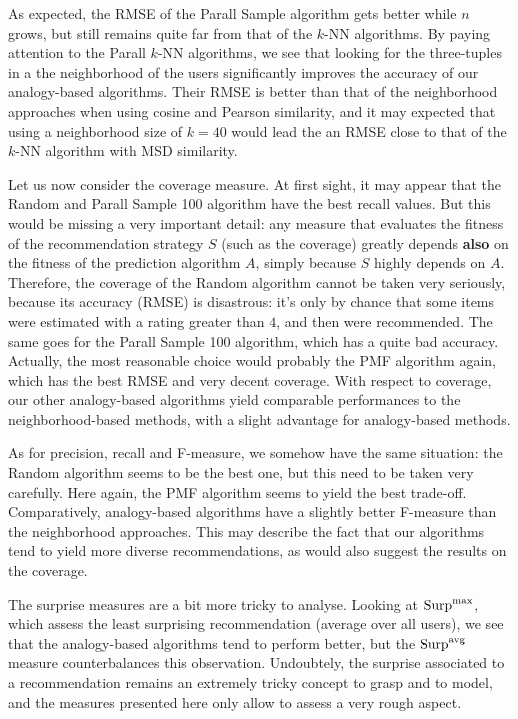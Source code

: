 As expected, the RMSE of the
Parall Sample algorithm gets better while $n$ grows, but still
remains quite far from that of the $k$-NN algorithms. By paying attention to
the Parall $k$-NN algorithms, we see that looking for the
three-tuples in a the neighborhood of the users significantly improves the
accuracy of our analogy-based algorithms. Their RMSE is better than that of the
neighborhood approaches when using cosine and Pearson similarity, and it may
expected that using a neighborhood size of $k=40$ would lead the an RMSE close
to that of the $k$-NN algorithm with MSD similarity.

Let us now consider the coverage measure. At first sight, it may appear that
the Random and Parall Sample 100 algorithm have the best recall values. But this
would be missing a very important detail: any measure that evaluates the
fitness of the recommendation strategy $S$ (such as the coverage) greatly
depends \textbf{also} on the fitness of the prediction algorithm $A$, simply
because $S$ highly depends on $A$. Therefore, the coverage of the Random
algorithm cannot be taken very seriously, because its accuracy (RMSE) is
disastrous: it's only by chance that some items were estimated with a rating
greater than $4$, and then were recommended. The same goes for the Parall
Sample 100 algorithm, which has a quite bad accuracy.  Actually, the most
reasonable choice would probably the PMF algorithm again, which has the best
RMSE and very decent coverage. With respect to coverage, our other
analogy-based algorithms yield comparable performances to the
neighborhood-based methods, with a slight advantage for analogy-based methods.

As for precision, recall and F-measure, we somehow have the same situation: the
Random algorithm seems to be the best one, but this need to be taken very
carefully. Here again, the PMF algorithm seems to yield the best trade-off.
Comparatively, analogy-based algorithms have a slightly better F-measure than
the neighborhood approaches. This may describe the fact that our algorithms
tend to yield more diverse recommendations, as would also suggest the results
on the coverage.

The surprise measures are a bit more tricky to analyse. Looking at $\text{Surp}^{\text{max}}$,
which assess the least surprising recommendation (average over all users), we
see that the analogy-based algorithms tend to perform better, but the
$\text{Surp}^{\text{avg}}$ measure counterbalances this observation. Undoubtely, the surprise
associated to a recommendation remains an extremely tricky concept to grasp and
to model, and the measures presented here only allow to assess a very rough
aspect.

